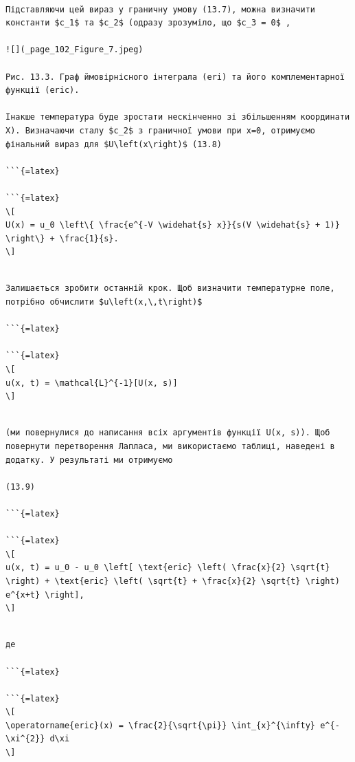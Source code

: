\documentclass[
]{article}
\begin{document}
\begin{verbatim}

Підставляючи цей вираз у граничну умову (13.7), можна визначити константи $c_1$ та $c_2$ (одразу зрозуміло, що $c_3 = 0$ ,

![](_page_102_Figure_7.jpeg)

Рис. 13.3. Граф ймовірнісного інтеграла (eri) та його комплементарної функції (eric).

Інакше температура буде зростати нескінченно зі збільшенням координати X). Визначаючи сталу $c_2$ з граничної умови при x=0, отримуємо фінальний вираз для $U\left(x\right)$ (13.8)

```{=latex}

```{=latex}
\[
U(x) = u_0 \left\{ \frac{e^{-V \widehat{s} x}}{s(V \widehat{s} + 1)} \right\} + \frac{1}{s}.
\]
\end{verbatim}

\begin{verbatim}

Залишається зробити останній крок. Щоб визначити температурне поле, потрібно обчислити $u\left(x,\,t\right)$ 

```{=latex}

```{=latex}
\[
u(x, t) = \mathcal{L}^{-1}[U(x, s)]
\]
\end{verbatim}

\begin{verbatim}

(ми повернулися до написання всіх аргументів функції U(x, s)). Щоб повернути перетворення Лапласа, ми використаємо таблиці, наведені в додатку. У результаті ми отримуємо

(13.9)

```{=latex}

```{=latex}
\[
u(x, t) = u_0 - u_0 \left[ \text{eric} \left( \frac{x}{2} \sqrt{t} \right) + \text{eric} \left( \sqrt{t} + \frac{x}{2} \sqrt{t} \right) e^{x+t} \right],
\]
\end{verbatim}

\begin{verbatim}

де

```{=latex}

```{=latex}
\[
\operatorname{eric}(x) = \frac{2}{\sqrt{\pi}} \int_{x}^{\infty} e^{-\xi^{2}} d\xi
\]
\end{verbatim}
\end{document}
